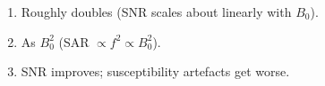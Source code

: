\begin{enumerate}[leftmargin=1.6em,itemsep=2pt]
\item Roughly doubles (SNR scales about linearly with $B_0$).
\item As $B_0^2$ (SAR $\propto f^2 \propto B_0^2$).
\item SNR improves; susceptibility artefacts get worse.
\end{enumerate}
